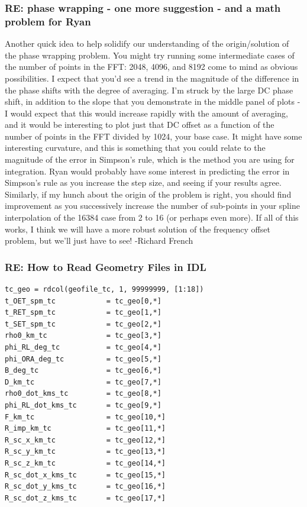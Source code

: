 \documentclass[crop=false,class=article,oneside]{standalone}
\begin{document}
\subsubsection{\footnotesize RE: phase wrapping - one more suggestion - and a math problem for Ryan}
Another quick idea to help solidify our understanding of the origin/solution of the phase wrapping problem. You might try running some intermediate cases of the number of points in the FFT: 2048, 4096, and 8192 come to mind as obvious possibilities. I expect that you'd see a trend in the magnitude of the difference in the phase shifts with the degree of averaging. I'm struck by the large DC phase shift, in addition to the slope that you demonstrate in the middle panel of plots - I would expect that this would increase rapidly with the amount of averaging, and it would be interesting to plot just that DC offset as a function of the number of points in the FFT divided by 1024, your base case. It might have some interesting curvature, and this is something that you could relate to the magnitude of the error in Simpson's rule, which is the method you are using for integration. Ryan would probably have some interest in predicting the error in Simpson's rule as you increase the step size, and seeing if your results agree. Similarly, if my hunch about the origin of the problem is right, you should find improvement as you successively increase the number of sub-points in your spline interpolation of the 16384 case from 2 to 16 (or perhaps even more). If all of this works, I think we will have a more robust solution of the frequency offset problem, but we'll just have to see! -Richard French
\subsubsection{\footnotesize RE: How to Read Geometry Files in IDL}
\begin{lstlisting}[language=IDL]
tc_geo = rdcol(geofile_tc, 1, 99999999, [1:18])
t_OET_spm_tc            = tc_geo[0,*]
t_RET_spm_tc            = tc_geo[1,*]
t_SET_spm_tc            = tc_geo[2,*]
rho0_km_tc              = tc_geo[3,*]
phi_RL_deg_tc           = tc_geo[4,*]
phi_ORA_deg_tc          = tc_geo[5,*]
B_deg_tc                = tc_geo[6,*]
D_km_tc                 = tc_geo[7,*]
rho0_dot_kms_tc         = tc_geo[8,*]
phi_RL_dot_kms_tc       = tc_geo[9,*]
F_km_tc                 = tc_geo[10,*]
R_imp_km_tc             = tc_geo[11,*]
R_sc_x_km_tc            = tc_geo[12,*]
R_sc_y_km_tc            = tc_geo[13,*]
R_sc_z_km_tc            = tc_geo[14,*]
R_sc_dot_x_kms_tc       = tc_geo[15,*]
R_sc_dot_y_kms_tc       = tc_geo[16,*]
R_sc_dot_z_kms_tc       = tc_geo[17,*]
\end{lstlisting}
\end{document}
